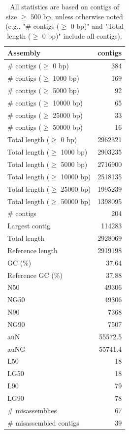 \documentclass[12pt,a4paper]{article}
\begin{document}
\begin{table}[ht]
\begin{center}
\caption{All statistics are based on contigs of size $\geq$ 500 bp, unless otherwise noted (e.g., "\# contigs ($\geq$ 0 bp)" and "Total length ($\geq$ 0 bp)" include all contigs).}
\begin{tabular}{|l*{1}{|r}|}
\hline
Assembly & contigs \\ \hline
\# contigs ($\geq$ 0 bp) & 384 \\ \hline
\# contigs ($\geq$ 1000 bp) & 169 \\ \hline
\# contigs ($\geq$ 5000 bp) & 92 \\ \hline
\# contigs ($\geq$ 10000 bp) & 65 \\ \hline
\# contigs ($\geq$ 25000 bp) & 33 \\ \hline
\# contigs ($\geq$ 50000 bp) & 16 \\ \hline
Total length ($\geq$ 0 bp) & 2962321 \\ \hline
Total length ($\geq$ 1000 bp) & 2903235 \\ \hline
Total length ($\geq$ 5000 bp) & 2716900 \\ \hline
Total length ($\geq$ 10000 bp) & 2518135 \\ \hline
Total length ($\geq$ 25000 bp) & 1995239 \\ \hline
Total length ($\geq$ 50000 bp) & 1398095 \\ \hline
\# contigs & 204 \\ \hline
Largest contig & 114283 \\ \hline
Total length & 2928069 \\ \hline
Reference length & 2919198 \\ \hline
GC (\%) & 37.64 \\ \hline
Reference GC (\%) & 37.88 \\ \hline
N50 & 49306 \\ \hline
NG50 & 49306 \\ \hline
N90 & 7368 \\ \hline
NG90 & 7507 \\ \hline
auN & 55572.5 \\ \hline
auNG & 55741.4 \\ \hline
L50 & 18 \\ \hline
LG50 & 18 \\ \hline
L90 & 79 \\ \hline
LG90 & 78 \\ \hline
\# misassemblies & 67 \\ \hline
\# misassembled contigs & 39 \\ \hline

\end{tabular}
\end{center}
\end{table}
\end{document}
